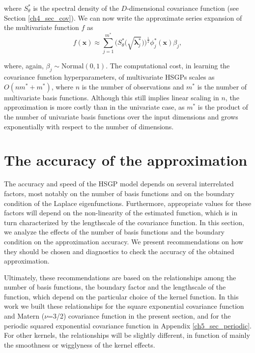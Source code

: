 \documentclass[onecolumn,a4paper,11pt]{article}
\begin{document}
\noindent where $S^{\ast}_{\theta}$ is the spectral density of the $D$-dimensional covariance function (see Section \ref{ch4_sec_cov}). We can now write the approximate series expansion of the multivariate function $f$ as
%
\begin{equation}\label{eq_approxf_multi}
f(\bm{x}) \approx \sum_{j=1}^{m^{\ast}} 
\big( S^{\ast}_{\theta} \big(\sqrt{\bm{\lambda}^{\ast}_j} \big)\big)^{\! \frac{1}{2}} \phi^{\ast}_j(\bm{x}) \beta_j, 
\end{equation}

\noindent where, again, $\beta_j \sim \text{Normal}(0,1)$. The computational cost, in learning the covariance function hyperparameters, of multivariate HSGPs scales as $O(n m^{\ast} + m^{\ast})$, where $n$ is the number of observations and $m^{\ast}$ is the number of multivariate basis functions. Although this still implies linear scaling in $n$, the approximation is more costly than in the univariate case, as $m^{\ast}$ is the product of the number of univariate basis functions over the input dimensions and grows exponentially with respect to the number of  dimensions.


\section{The accuracy of the approximation}\label{ch5_sec_accuracy}

The accuracy and speed of the HSGP model depends on several interrelated factors, most notably on the number of basis functions and on the boundary condition of the Laplace eigenfunctions. Furthermore, appropriate values for these factors will depend on the non-linearity of the estimated function, which is in turn characterized by the lengthscale of the covariance function.
In this section, we analyze the effects of the number of basis functions and the boundary condition on the approximation accuracy. We present recommendations on how they should be chosen and diagnostics to check the accuracy of the obtained approximation. 

Ultimately, these recommendations are based on the relationships among the number of basis functions, the boundary factor and the lengthscale of the function, which depend on the particular choice of the kernel function. In this work we built these relationships for the square exponential covariance function and Matern ($\nu$=3/2) covariance function in the present section, and for the periodic squared exponential covariance function in Appendix \ref{ch5_sec_periodic}. For other kernels, the relationships will be slightly different, in function of mainly the smoothness or wigglyness of the kernel effects.
\end{document}
